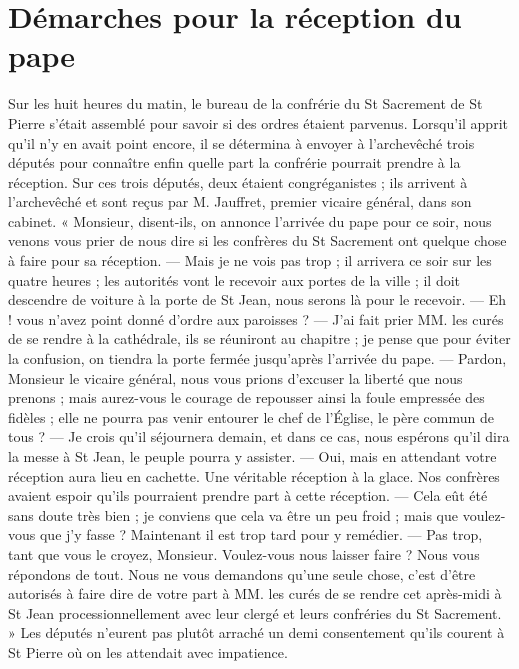 \section*{Démarches pour la réception du pape}
Sur les huit heures du matin, le bureau de la confrérie du St Sacrement de St Pierre s'était assemblé pour savoir si des ordres étaient parvenus. Lorsqu'il apprit qu'il n'y en avait point encore, il se détermina à envoyer à l'archevêché trois députés pour connaître enfin quelle part la confrérie pourrait prendre à la réception. Sur ces trois députés, deux étaient congréganistes ; ils arrivent à l'archevêché et sont reçus par M. Jauffret, premier vicaire général, dans son cabinet. « Monsieur, disent-ils, on annonce l'arrivée du pape pour ce soir, nous venons vous prier de nous dire si les confrères du St Sacrement ont quelque chose à faire pour sa réception. — Mais je ne vois pas trop ; il arrivera ce soir sur les quatre heures ; les autorités vont le recevoir aux portes de la ville ; il doit descendre de voiture à la porte de St Jean, nous serons là pour le recevoir. — Eh ! vous n'avez point donné d'ordre aux paroisses ? — J'ai fait
prier MM. les curés de se rendre à la cathédrale, ils se réuniront au chapitre ; je pense que pour éviter la confusion, on tiendra la porte fermée jusqu'après l'arrivée du pape. — Pardon, Monsieur le vicaire général, nous vous prions d'excuser la liberté que nous prenons ; mais aurez-vous le courage de repousser ainsi la foule empressée des fidèles ; elle ne pourra pas venir entourer le chef de l'Église, le père commun de tous ? — Je crois qu'il séjournera demain, et dans ce cas, nous espérons qu'il dira la messe à St Jean, le peuple pourra y assister. — Oui, mais en attendant votre réception aura lieu en cachette. Une véritable réception à la glace. Nos confrères avaient espoir qu'ils pourraient prendre part à cette réception. — Cela eût été sans doute très bien ; je conviens que cela va être un peu froid ; mais que voulez-vous que j'y fasse ? Maintenant il est trop tard pour y remédier. — Pas trop, tant que vous le croyez, Monsieur. Voulez-vous nous laisser faire ? Nous vous répondons de tout. Nous ne vous demandons qu'une seule chose, c'est d'être autorisés à faire dire de votre part à MM. les curés de se rendre cet après-midi à St Jean processionnellement avec leur clergé et leurs confréries du St Sacrement. » Les députés n'eurent pas plutôt arraché un demi consentement qu'ils courent à St Pierre où on les attendait avec impatience.

